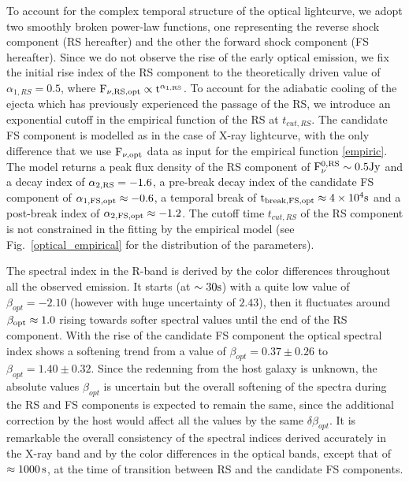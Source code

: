 \documentclass{naturesubmissionstyle}
\begin{document}
To account for the complex temporal structure of the optical lightcurve, we adopt two smoothly broken power-law functions, one representing the reverse shock component (RS hereafter) and the other the forward shock component (FS hereafter). Since we do not observe the rise of the early optical emission, we fix the initial rise index of the RS component to the theoretically driven value of $\alpha_{1,RS}=0.5$\cite{Nakar2004}, where $\rm F_{\nu,RS,opt} \propto t^{\alpha_{1,RS}}$. To account for the adiabatic cooling of the ejecta\cite{Kobayashi2000} which has previously experienced the passage of the RS, we introduce an exponential cutoff in the empirical function of the RS at $t_{cut,RS}$. The candidate FS component is modelled as in the case of X-ray lightcurve, with the only difference that we use $\rm F_{\nu,opt}$ data as input for the  empirical function \ref{empiric}. The model returns a peak flux density of the RS component of $\rm F_{\nu}^{0,RS} \sim 0.5 Jy$ and a decay index of $\rm \alpha_{2,RS}=-1.6$, a pre-break decay index of the candidate FS component of $\rm \alpha_{1,FS,opt} \approx -0.6$, a temporal break of $\rm t_{break,FS,opt} \approx 4 \times 10^{4} s$ and a post-break index of $\rm \alpha_{2,FS,opt} \approx -1.2$. The cutoff time $t_{cut,RS}$ of the RS component is not %
constrained in the fitting by the empirical model (see Fig.~\ref{optical_empirical} for the distribution of the parameters).

The spectral index in the R-band is derived by the color differences throughout all the observed emission. It starts (at $\rm \sim 30 s$) with a quite low value of $\beta_{opt} =-2.10$ (however with huge uncertainty of $2.43$), then it fluctuates around $\rm \beta_{opt} \approx 1.0$ rising towards softer spectral values until the end of the RS component. With the rise of the candidate FS component the optical spectral index shows a softening trend from  a value of $\beta_{opt} = 0.37 \pm 0.26 $ to $\beta_{opt} = 1.40 \pm 0.32 $. Since the redenning from the host galaxy is unknown, the absolute values $\beta_{opt}$ is uncertain but the overall softening of the spectra during the RS and FS components is expected to remain the same, since the additional correction by the host would affect all the values by the same $\delta \beta_{opt}$.
It is remarkable the overall consistency of the spectral indices derived accurately in the X-ray band and by the color differences in the optical bands, except that of $\rm \approx 1000 \, s$, at the time of  transition between RS and the candidate FS components. 
\end{document}
